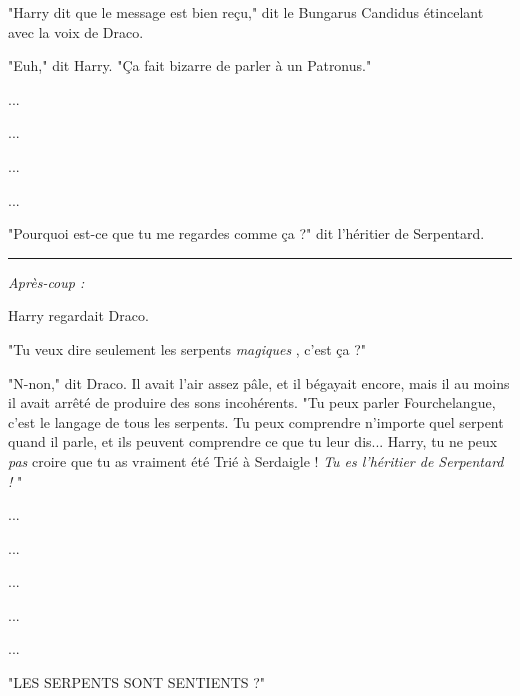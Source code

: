 "Harry dit que le message est bien reçu," dit le Bungarus Candidus étincelant avec la voix de Draco.

"Euh," dit Harry. "Ça fait bizarre de parler à un Patronus."

...

...

...

...

"Pourquoi est-ce que tu me regardes comme ça ?" dit l'héritier de Serpentard.
\par\noindent\rule{\textwidth}{0.4pt}
\emph{Après-coup :} 

Harry regardait Draco.

"Tu veux dire seulement les serpents \emph{magiques} , c'est ça ?"

"N-non," dit Draco. Il avait l'air assez pâle, et il bégayait encore, mais il au moins il avait arrêté de produire des sons incohérents. "Tu peux parler Fourchelangue, c'est le langage de tous les serpents. Tu peux comprendre n'importe quel serpent quand il parle, et ils peuvent comprendre ce que tu leur dis... Harry, tu ne peux \emph{pas}  croire que tu as vraiment été Trié à Serdaigle ! \emph{Tu es l'héritier de Serpentard !} "

...

...

...

...

...

"LES SERPENTS SONT SENTIENTS ?"

